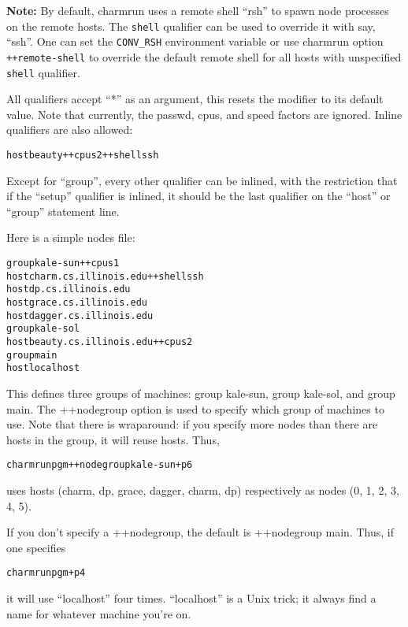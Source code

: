 {\bf Note:}
By default, charmrun uses a remote shell ``rsh'' to spawn node processes
on the remote hosts. The {\tt shell} qualifier can be used to override
it with say, ``ssh''. One can set the {\tt CONV\_RSH} environment variable
or use charmrun option {\tt ++remote-shell} to override the default remote 
shell for all hosts with unspecified {\tt shell} qualifier.

All qualifiers accept ``*'' as an argument, this resets the modifier to
its default value.  Note that currently, the passwd, cpus, and speed
factors are ignored.  Inline qualifiers are also allowed:

\begin{alltt}
host beauty ++cpus 2 ++shell ssh
\end{alltt}

Except for ``group'', every other qualifier can be inlined, with the
restriction that if the ``setup'' qualifier is inlined, it should be
the last qualifier on the ``host'' or ``group'' statement line.

Here is a simple nodes file:

\begin{alltt}
        group kale-sun ++cpus 1
          host charm.cs.illinois.edu ++shell ssh
          host dp.cs.illinois.edu
          host grace.cs.illinois.edu
          host dagger.cs.illinois.edu
        group kale-sol
          host beauty.cs.illinois.edu ++cpus 2
        group main
          host localhost
\end{alltt}

This defines three groups of machines: group kale-sun, group kale-sol,
and group main.  The ++nodegroup option is used to specify which group
of machines to use.  Note that there is wraparound: if you specify
more nodes than there are hosts in the group, it will reuse
hosts. Thus,

\begin{alltt}
        charmrun pgm ++nodegroup kale-sun +p6
\end{alltt}

uses hosts (charm, dp, grace, dagger, charm, dp) respectively as
nodes (0, 1, 2, 3, 4, 5).

If you don't specify a ++nodegroup, the default is ++nodegroup main.
Thus, if one specifies

\begin{alltt}
        charmrun pgm +p4
\end{alltt}

it will use ``localhost'' four times.  ``localhost'' is a Unix
trick; it always find a name for whatever machine you're on.

